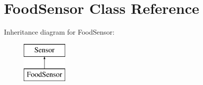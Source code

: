 \hypertarget{class_food_sensor}{}\section{Food\+Sensor Class Reference}
\label{class_food_sensor}
Inheritance diagram for Food\+Sensor\+:\begin{figure}[H]
\begin{center}
\leavevmode
\includegraphics[height=2.000000cm]{class_food_sensor}
\end{center}
\end{figure}
